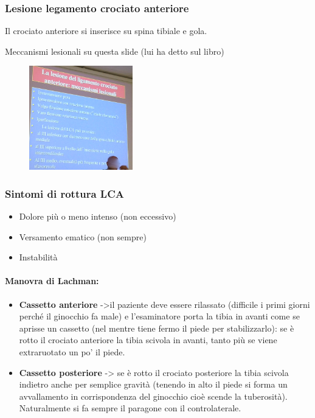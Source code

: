 \subsubsection{Lesione legamento crociato anteriore }

Il crociato anteriore si inserisce su spina tibiale e gola.

Meccanismi lesionali su questa slide (lui ha detto sul libro)

\begin{figure}[!ht]
\centering
\includegraphics[width=0.4\textwidth]{009/image15.png}
\end{figure}

\subsubsection{Sintomi di rottura LCA}

\begin{itemize}
\item
  Dolore più o meno intenso (non eccessivo)
\item
  Versamento ematico (non sempre)
\item
  Instabilità
\end{itemize}

\paragraph{Manovra di Lachman: }

\begin{itemize}
\item
  \textbf{Cassetto anteriore} ->il paziente deve essere rilassato (difficile i primi giorni perché il ginocchio fa male) e l'esaminatore porta la tibia in avanti come se aprisse un cassetto (nel mentre tiene fermo il piede per stabilizzarlo): se è rotto il crociato anteriore la tibia scivola in avanti, tanto più se viene extraruotato un po' il piede.
\item
  \textbf{Cassetto posteriore} -> se è rotto il crociato posteriore la tibia scivola indietro anche per semplice gravità (tenendo in alto il piede si forma un avvallamento in corrispondenza del ginocchio cioè scende la tuberosità). Naturalmente si fa sempre il paragone con il controlaterale.
\end{itemize}

